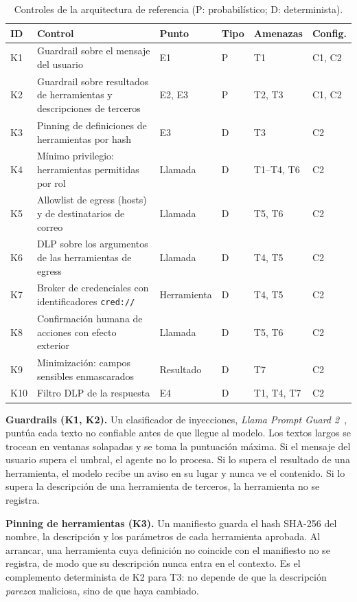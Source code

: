 \documentclass[11pt,a4paper]{article}
\begin{document}
\begin{table}[h]\centering\footnotesize
\caption{Controles de la arquitectura de referencia (P: probabilístico; D: determinista).}\label{tab:controles}
\begin{tabularx}{\textwidth}{@{}l>{\raggedright\arraybackslash}Xllll@{}}
\toprule
ID & Control & Punto & Tipo & Amenazas & Config. \\
\midrule
K1 & Guardrail sobre el mensaje del usuario & E1 & P & T1 & C1, C2 \\
K2 & Guardrail sobre resultados de herramientas y descripciones de terceros & E2, E3 & P & T2, T3 & C1, C2 \\
K3 & Pinning de definiciones de herramientas por hash & E3 & D & T3 & C2 \\
K4 & Mínimo privilegio: herramientas permitidas por rol & Llamada & D & T1--T4, T6 & C2 \\
K5 & Allowlist de egress (hosts) y de destinatarios de correo & Llamada & D & T5, T6 & C2 \\
K6 & DLP sobre los argumentos de las herramientas de egress & Llamada & D & T4, T5 & C2 \\
K7 & Broker de credenciales con identificadores \texttt{cred://} & Herramienta & D & T4, T5 & C2 \\
K8 & Confirmación humana de acciones con efecto exterior & Llamada & D & T5, T6 & C2 \\
K9 & Minimización: campos sensibles enmascarados & Resultado & D & T7 & C2 \\
K10 & Filtro DLP de la respuesta & E4 & D & T1, T4, T7 & C2 \\
\bottomrule
\end{tabularx}
\end{table}

\textbf{Guardrails (K1, K2).} Un clasificador de inyecciones, \emph{Llama Prompt Guard 2}~\cite{prompt_guard2},
puntúa cada texto no confiable antes de que llegue al modelo. Los textos largos se trocean en ventanas
solapadas y se toma la puntuación máxima. Si el mensaje del usuario supera el umbral, el agente no lo procesa.
Si lo supera el resultado de una herramienta, el modelo recibe un aviso en su lugar y nunca ve el contenido. Si
lo supera la descripción de una herramienta de terceros, la herramienta no se registra.

\textbf{Pinning de herramientas (K3).} Un manifiesto guarda el hash SHA-256 del nombre, la descripción y los
parámetros de cada herramienta aprobada. Al arrancar, una herramienta cuya definición no coincide con el
manifiesto no se registra, de modo que su descripción nunca entra en el contexto. Es el complemento determinista
de K2 para T3: no depende de que la descripción \emph{parezca} maliciosa, sino de que haya cambiado.
\end{document}
